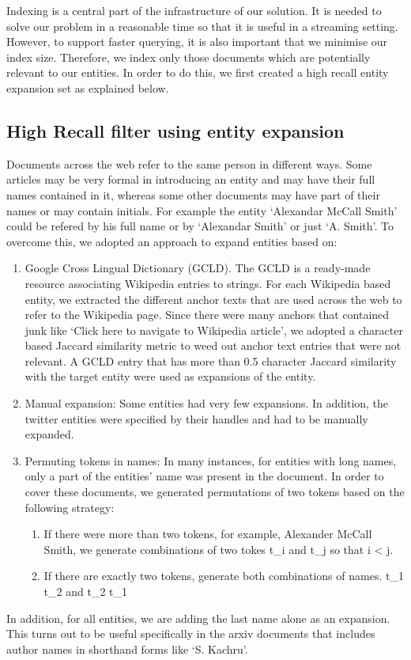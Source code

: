 Indexing is a central part of the infrastructure of our solution. It is needed to solve our problem in a reasonable time so that it is useful in a streaming setting. However, to support faster querying, it is also important that we minimise our index size. Therefore, we index only those documents which are potentially relevant to our entities. In order to do this, we first created a high recall entity expansion set as explained below. 
\subsection{High Recall filter using entity expansion}
Documents across the web refer to the same person in different ways. Some articles may be very formal in introducing an entity and may have their full names contained in it, whereas some other documents may have part of their names or may contain initials. For example the entity ‘Alexandar McCall Smith’ could be refered by his full name or by ‘Alexandar Smith’ or just ‘A. Smith’. To overcome this, we adopted an approach to expand entities based on:
\begin{enumerate}
\item Google Cross Lingual Dictionary (GCLD). The GCLD is a ready-made resource associating Wikipedia entries to strings. For each Wikipedia based entity, we extracted the different anchor texts that are used across the web to refer to the Wikipedia page. Since there were many anchors that contained junk like ‘Click here to navigate to Wikipedia article’, we adopted a character based Jaccard similarity metric to weed out anchor text entries that were not relevant. A GCLD entry that has more than 0.5 character Jaccard similarity with the target entity were used as expansions of the entity.
\item Manual expansion: Some entities had very few expansions. In addition, the twitter entities were specified by their handles and had to be manually expanded.
\item Permuting tokens in names: In many instances, for entities with long names, only a part of the entities’ name was present in the document. In order to cover these documents, we generated permutations of two tokens based on the following strategy:
  \begin{enumerate}
  \item If there were more than two tokens, for example, Alexander McCall Smith, we generate combinations of two tokes t\_i and t\_j so that i < j.
  \item If there are exactly two tokens, generate both combinations of names. t\_1 t\_2 and t\_2 t\_1
  \end{enumerate}
\end{enumerate}
In addition, for all entities, we are adding the last name alone as an expansion. This turns out to be useful specifically in the arxiv documents that includes author names in shorthand forms like ‘S. Kachru’.

